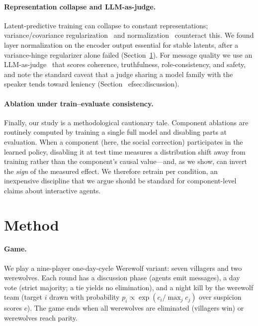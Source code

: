 \documentclass[11pt]{article}
\begin{document}
\paragraph{Representation collapse and LLM-as-judge.} Latent-predictive training can
collapse to constant representations; variance/covariance
regularization~\citep{bardes2022vicreg} and normalization~\citep{ba2016layernorm}
counteract this. We found layer normalization on the encoder output essential for
stable latents, after a variance-hinge regularizer alone failed
(Section~\ref{sec:method}). For message quality we use an
LLM-as-judge~\citep{zhao2023llmjudge} that scores coherence, truthfulness,
role-consistency, and safety, and note the standard caveat that a judge sharing a
model family with the speaker tends toward leniency (Section~
ef{sec:discussion}).

\paragraph{Ablation under train--evaluate consistency.} Finally, our study is a
methodological cautionary tale. Component ablations are routinely computed by
training a single full model and disabling parts at evaluation. When a component
(here, the social correction) participates in the learned policy, disabling it at
test time measures a distribution shift away from training rather than the
component's causal value---and, as we show, can invert the \emph{sign} of the
measured effect. We therefore retrain per condition, an inexpensive discipline that
we argue should be standard for component-level claims about interactive agents.

\section{Method}
\label{sec:method}
\paragraph{Game.} We play a nine-player one-day-cycle Werewolf variant: seven
villagers and two werewolves. Each round has a discussion phase (agents emit
messages), a day vote (strict majority; a tie yields no elimination), and a night
kill by the werewolf team (target $i$ drawn with probability
$p_i \propto \exp(c_i / \max_j c_j)$ over suspicion scores $c$). The game ends when
all werewolves are eliminated (villagers win) or werewolves reach parity.
\end{document}
